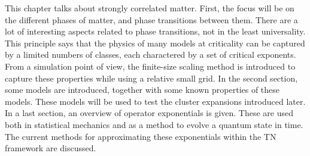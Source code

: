 This chapter talks about strongly correlated matter. First, the focus will be on the different phases of matter, and phase transitions between them. There are a lot of interesting aspects related to phase transitions, not in the least universality. This principle says that the physics of many models at criticality can be captured by a limited numbers of classes, each charactered by a set of critical exponents. From a simulation point of view, the finite-size scaling method is introduced to capture these properties while using a relative small grid.
In the second section, some models are introduced, together with some known properties of these models. These models will be used to test the cluster expansions introduced later.
In a last section, an overview of operator exponentials is given. These are used both in statistical mechanics and as a method to evolve a quantum state in time. The current methods for approximating these exponentials within the \Gls{TN} framework are discussed.